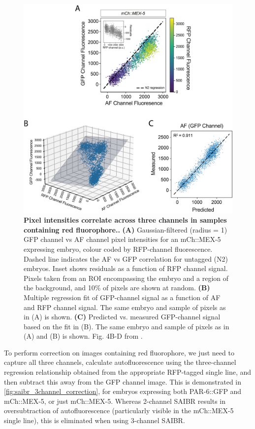\documentclass[12pt]{"report"}
\newcommand{\mycaption}[2]{\caption[#1]{\textbf{#1.} #2}}
\begin{document}
\begin{figure}
\includegraphics[scale=1]{saibr_3channel_correlation}
\centering
\mycaption{Pixel intensities correlate across three channels in samples containing red fluorophore.}{
\textbf{(A)} Gaussian-filtered (radius = 1) GFP channel vs AF channel pixel intensities for an mCh::MEX-5 expressing embryo, colour coded by RFP-channel fluorescence. Dashed line indicates the AF vs GFP correlation for untagged (N2) embryos. Inset shows residuals as a function of RFP channel signal. Pixels taken from an ROI encompassing the embryo and a region of the background, and 10\% of pixels are shown at random.
\textbf{(B)} Multiple regression fit of GFP-channel signal as a function of AF and RFP channel signal. The same embryo and sample of pixels as in (A) is shown.
\textbf{(C)} Predicted vs. measured GFP-channel signal based on the fit in (B). The same embryo and sample of pixels as in (A) and (B) is shown.
Fig. 4B-D from \textcite{Rodrigues2022}.
}
\label{fig:saibr_3channel_correlation}
\end{figure}

To perform correction on images containing red fluorophore, we just need to capture all three channels, calculate autofluorescence using the three-channel regression relationship obtained from the appropriate RFP-tagged single line, and then subtract this away from the GFP channel image. This is demonstrated in \cref{fig:saibr_3channel_correction}, for embryos expressing both PAR-6::GFP and mCh::MEX-5, or just mCh::MEX-5. Whereas 2-channel SAIBR results in oversubtraction of autofluorescence (particularly visible in the mCh::MEX-5 single line), this is eliminated when using 3-channel SAIBR.\\
\end{document}
